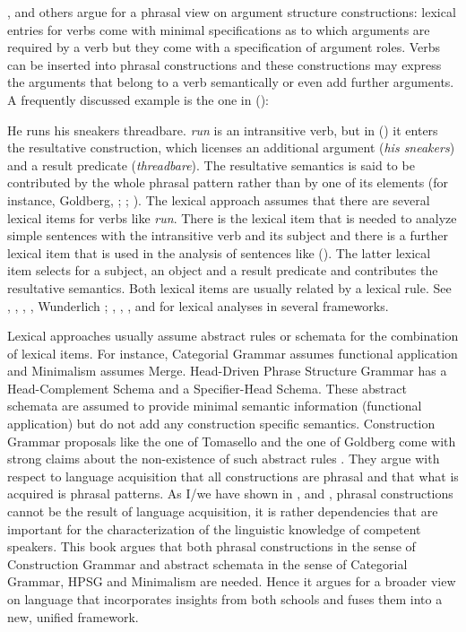 \citet{Goldberg95a,Goldberg2006a}, \citet{Tomasello2003a} and others argue for a phrasal view on argument structure
constructions: lexical entries for verbs come with minimal specifications as to which arguments are
required by a verb but they come with a specification of argument roles. Verbs can be inserted into phrasal
constructions and these constructions may express the arguments that belong to a verb semantically
or even add further arguments. A frequently discussed example is the one in ():


\ea
\label{ex-runshoes-threadbare}
He runs his sneakers threadbare.
\z
\emph{run} is an intransitive verb, but in () it enters the resultative construction,
which licenses an additional argument (\emph{his sneakers}) and a result predicate
(\emph{threadbare}). The resultative semantics is said to be contributed by the whole phrasal
pattern rather than by one of its elements (for instance, Goldberg, \citeyear[--89]{Goldberg91a}; \citeyear{Goldberg95a}; ). The lexical approach assumes that there are several lexical items for verbs
like \emph{run}. There is the lexical item that is needed to analyze simple sentences with the
intransitive verb and its subject and there is a further lexical item that is used in the analysis
of sentences like (). The latter lexical item selects for a subject, an object and a result
predicate and contributes the resultative semantics. Both lexical items are usually related by a lexical
rule. See , , , ,
Wunderlich \citeyear[]{Wunderlich92a-u-kopiert}; \citeyear[--126]{Wunderlich97c}, ,
, and 
for lexical analyses in several frameworks.

Lexical approaches usually assume abstract rules or schemata for the combination of lexical
items. For instance, Categorial Grammar assumes functional application and Minimalism assumes
Merge. Head-Driven Phrase Structure Grammar has a Head-Complement Schema and a Specifier-Head
Schema. These abstract schemata are assumed to provide minimal semantic information (functional
application) but do not add any construction specific semantics. Construction Grammar proposals like
the one of Tomasello and the one of Goldberg come with strong claims about the non-existence of such
abstract rules \citep[]{Tomasello2003a}. They argue with respect to language acquisition
that all constructions are phrasal and that what is acquired is phrasal patterns. As I/we have shown
in ,  and ,
phrasal constructions cannot be the result of language acquisition, it is rather dependencies that
are important for the characterization of the linguistic knowledge of competent speakers. This book
argues that both phrasal constructions in the sense of Construction Grammar and abstract schemata in
the sense of Categorial Grammar, HPSG and Minimalism are needed. Hence it argues for a broader view
on language that incorporates insights from both schools and fuses them into a new, unified
framework.

